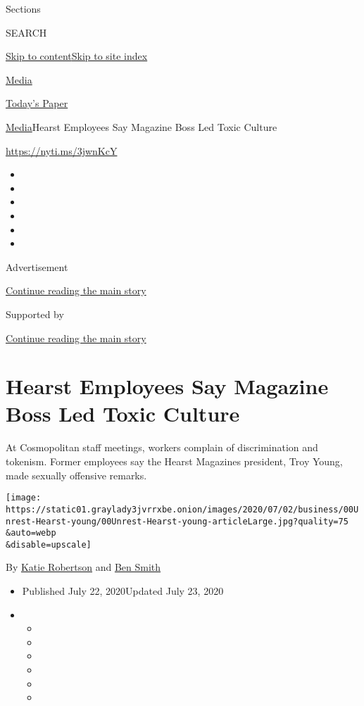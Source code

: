 Sections

SEARCH

\protect\hyperlink{site-content}{Skip to
content}\protect\hyperlink{site-index}{Skip to site index}

\href{https://www.nytimes3xbfgragh.onion/section/business/media}{Media}

\href{https://myaccount.nytimes3xbfgragh.onion/auth/login?response_type=cookie\&client_id=vi}{}

\href{https://www.nytimes3xbfgragh.onion/section/todayspaper}{Today's
Paper}

\href{/section/business/media}{Media}\textbar{}Hearst Employees Say
Magazine Boss Led Toxic Culture

\url{https://nyti.ms/3jwnKcY}

\begin{itemize}
\item
\item
\item
\item
\item
\item
\end{itemize}

Advertisement

\protect\hyperlink{after-top}{Continue reading the main story}

Supported by

\protect\hyperlink{after-sponsor}{Continue reading the main story}

\hypertarget{hearst-employees-say-magazine-boss-led-toxic-culture}{%
\section{Hearst Employees Say Magazine Boss Led Toxic
Culture}\label{hearst-employees-say-magazine-boss-led-toxic-culture}}

At Cosmopolitan staff meetings, workers complain of discrimination and
tokenism. Former employees say the Hearst Magazines president, Troy
Young, made sexually offensive remarks.

\texttt{[image: https://static01.graylady3jvrrxbe.onion/images/2020/07/02/business/00Unrest-Hearst-young/00Unrest-Hearst-young-articleLarge.jpg?quality=75\\\&auto=webp\\\&disable=upscale]}

By \href{https://www.nytimes3xbfgragh.onion/by/katie-robertson}{Katie
Robertson} and
\href{https://www.nytimes3xbfgragh.onion/by/ben-smith}{Ben Smith}

\begin{itemize}
\item
  Published July 22, 2020Updated July 23, 2020
\item
  \begin{itemize}
  \item
  \item
  \item
  \item
  \item
  \item
  \end{itemize}
\end{itemize}

